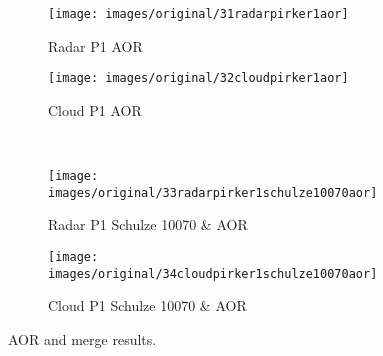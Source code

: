 \begin{figure}[htp] \centering
    \begin{subfigure}[b]{0.48\columnwidth}
        \texttt{[image: images/original/31radarpirker1aor]}
        \caption{Radar P1 AOR}
        \label{fig:31radarpirker1aor} 
    \end{subfigure}
    \begin{subfigure}[b]{0.48\columnwidth}
        \texttt{[image: images/original/32cloudpirker1aor]}
        \caption{Cloud P1 AOR}
        \label{fig:32cloudpirker1aor} 
    \end{subfigure}\\
        \begin{subfigure}[b]{0.48\columnwidth}
        \texttt{[image: images/original/33radarpirker1schulze10070aor]}
        \caption{Radar P1 Schulze 10070 & AOR}
        \label{fig:33radarpirker1schulze10070aor} 
    \end{subfigure}
    \begin{subfigure}[b]{0.48\columnwidth}
        \texttt{[image: images/original/34cloudpirker1schulze10070aor]}
        \caption{Cloud P1 Schulze 10070 & AOR}
        \label{fig:34cloudpirker1schulze10070aor} 
    \end{subfigure}
    \caption{AOR and merge results.}
    \label{fig:35schulze10070aorradarandcloud}
\end{figure}